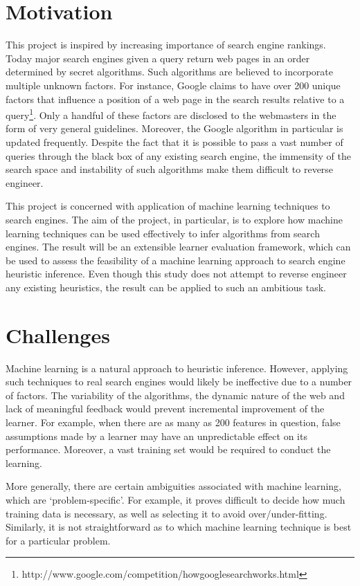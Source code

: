 \documentclass[12pt,notitlepage,twoside]{scrbook}
\begin{document}
\section{Motivation}
This project is inspired by increasing importance of search engine rankings.
Today major search engines given a query return web pages in an order
determined by secret algorithms. Such algorithms are believed 
to incorporate multiple unknown factors.
For instance, Google claims to have over 200 unique factors that influence a
position of a web page in the search results relative to a query\footnote{http://www.google.com/competition/howgooglesearchworks.html}. Only
a handful of these factors are disclosed to the webmasters  in the form of very
general guidelines. Moreover, the Google algorithm in particular is updated
frequently. 
Despite the fact that it is possible to pass a vast number of
queries through the black box of any existing search engine, the immensity of
the search space and instability of such algorithms make them difficult to
reverse engineer.

This project is concerned with application of machine learning techniques to search
engines. The aim of the project, in particular, is to explore how machine learning
techniques can be used effectively to infer algorithms from search engines. The result
will be an extensible learner evaluation framework, which can be used to assess the
feasibility of a machine learning approach to search engine heuristic inference.  Even
though this study does not attempt to reverse engineer any existing heuristics, the result
can be applied to such an ambitious task. 

\section{Challenges}
Machine learning is a natural approach to heuristic inference. However, applying such
techniques to real search engines would likely be ineffective due to a number of
factors. The variability of the  algorithms, the dynamic nature of the web and lack of
meaningful feedback would prevent incremental improvement of the learner. For example,
when there are as many as 200 features in question, false assumptions made by a learner
may have an unpredictable effect on its performance. Moreover, a vast training set would
be required to conduct the learning.

More generally, there are certain ambiguities associated with machine learning, which are
`problem-specific'. For example, it proves difficult to decide how much training data is
necessary, as well as selecting it to avoid over/under-fitting\cite{domingos}. Similarly,
it is not straightforward as to which machine learning technique is best for a particular
problem.
\end{document}
